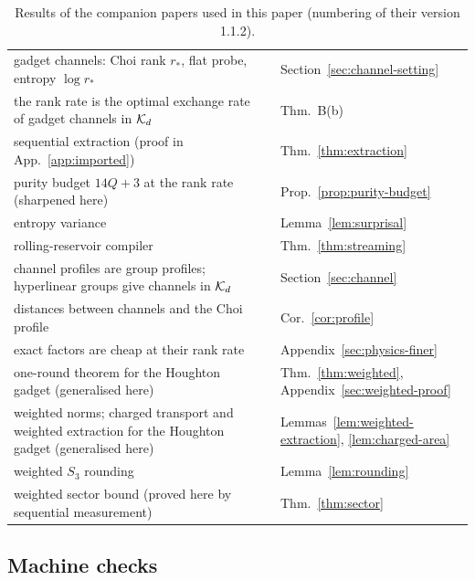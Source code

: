 \begin{table}[ht]
\begin{tabular}{@{}>{\raggedright\arraybackslash}p{}>{\raggedright\arraybackslash}p{}>{\raggedright\arraybackslash}p{}@{}}
gadget channels: Choi rank $r_*$, flat probe, entropy $\log r_*$ & \cite[Prop.~9.1]{DouglasMghirbiB} & Section~\ref{sec:channel-setting}\\
the rank rate is the optimal exchange rate of gadget channels in $\mathcal K_d$ & \cite[Props.~3.1, 9.1]{DouglasMghirbiB} & Thm.~B(b)\\
sequential extraction (proof in App.~\ref{app:imported}) & \cite[Thm.~5.2]{DouglasMghirbiB} & Thm.~\ref{thm:extraction}\\
purity budget $14Q+3$ at the rank rate (sharpened here) & \cite[Thm.~5.8]{DouglasMghirbiB} & Prop.~\ref{prop:purity-budget}\\
entropy variance & \cite[Lemma~5.9]{DouglasMghirbiB} & Lemma~\ref{lem:surprisal}\\
rolling-reservoir compiler & \cite[Appendix~A, Lemmas~A.1, A.4]{DouglasMghirbiB} & Thm.~\ref{thm:streaming}\\
channel profiles are group profiles; hyperlinear groups give channels in $\mathcal K_d$ & \cite[Thm.~9.2]{DouglasMghirbiB} & Section~\ref{sec:channel}\\
distances between channels and the Choi profile & \cite[Def.~2.1, Section~2]{DouglasMghirbiB} & Cor.~\ref{cor:profile}\\
exact factors are cheap at their rank rate & \cite[Thm.~8.6]{DouglasMghirbiB} & Appendix~\ref{sec:physics-finer}\\
one-round theorem for the Houghton gadget (generalised here) & \cite[Thm.~5.5, Appendix~B]{DouglasMghirbiB} & Thm.~\ref{thm:weighted}, Appendix~\ref{sec:weighted-proof}\\
weighted norms; charged transport and weighted extraction for the Houghton gadget (generalised here) & \cite[Appendix~B, Lemmas~B.2, B.4]{DouglasMghirbiB} & Lemmas~\ref{lem:weighted-extraction}, \ref{lem:charged-area}\\
weighted $S_3$ rounding & \cite[Lemma~B.3]{DouglasMghirbiB} & Lemma~\ref{lem:rounding}\\
weighted sector bound (proved here by sequential measurement) & \cite[Thm.~B.1]{DouglasMghirbiB} & Thm.~\ref{thm:sector}\\
\bottomrule
\end{tabular}
\caption{Results of the companion papers used in this paper (numbering of their version 1.1.2).}
\label{tab:dependencies}
\end{table}

\subsection{Machine checks}\label{app:machine-checks}

